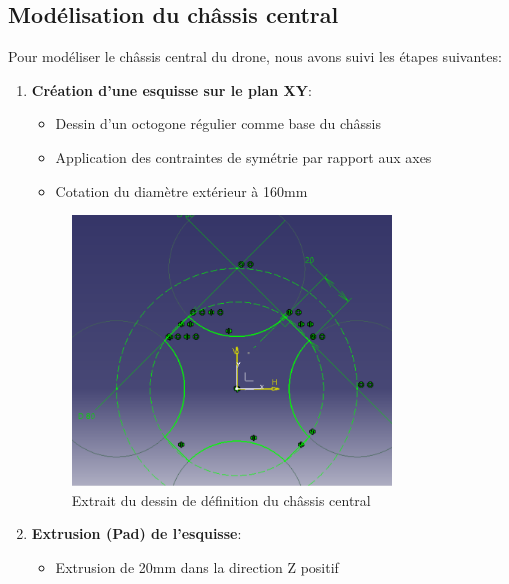 \documentclass[a4paper,12pt]{report}
\begin{document}
\subsection{Modélisation du châssis central}
Pour modéliser le châssis central du drone, nous avons suivi les étapes suivantes:
\begin{enumerate}
    \item \textbf{Création d'une esquisse sur le plan XY}:
    \begin{itemize}
        \item Dessin d'un octogone régulier comme base du châssis
        \item Application des contraintes de symétrie par rapport aux axes
        \item Cotation du diamètre extérieur à 160mm
    \end{itemize}
    
    \begin{figure}[H]
        \centering
        \includegraphics[width=0.8\textwidth]{images/esquisse_chassis_central.png}
        \caption{Extrait du dessin de définition du châssis central}
        \label{fig:dessin_def}
    \end{figure}
    
    \item \textbf{Extrusion (Pad) de l'esquisse}:
    \begin{itemize}
        \item Extrusion de 20mm dans la direction Z positif
    \end{itemize}
    

\end{enumerate}
\end{document}
